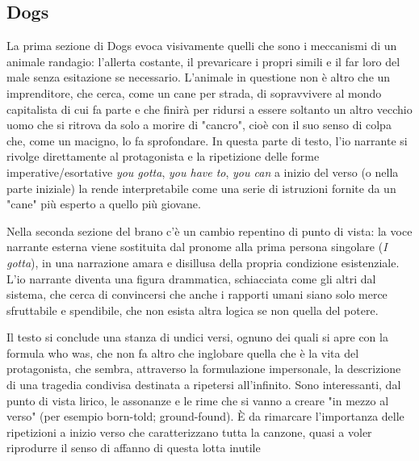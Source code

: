 \documentclass[class=book, crop=false, oneside, 12pt]{standalone}
\begin{document}
    \subsection{Dogs}
    La prima sezione di Dogs evoca visivamente quelli che sono i meccanismi di un animale randagio: l'allerta costante, il prevaricare i propri simili e il far loro del male senza esitazione se necessario. L'animale in questione non è altro che un imprenditore, che cerca, come un cane per strada, di sopravvivere al mondo capitalista di cui fa parte e che finirà per ridursi a essere soltanto un altro vecchio uomo che si ritrova da solo a morire di "cancro", cioè con il suo senso di colpa che, come un macigno, lo fa sprofondare. In questa parte di testo, l'io narrante si rivolge direttamente al protagonista e la ripetizione delle forme  imperative/esortative \emph{you gotta}, \emph{you have to}, \emph{you can} a inizio del verso (o nella parte iniziale) la rende interpretabile come una serie di istruzioni fornite da un "cane" più esperto a quello più giovane.

    Nella seconda sezione del brano c'è un cambio repentino di punto di vista: la voce narrante esterna viene sostituita dal pronome alla prima persona singolare (\emph{I gotta}), in una narrazione amara e disillusa della propria condizione esistenziale. L'io narrante diventa una figura drammatica, schiacciata come gli altri dal sistema, che cerca di convincersi che anche i rapporti umani siano solo merce sfruttabile e spendibile, che non esista altra logica se non quella del potere.

    Il testo si conclude una stanza di undici versi, ognuno dei quali si apre con la formula who was, che non fa altro che inglobare quella che è la vita del protagonista, che sembra, attraverso la formulazione impersonale, la descrizione di una tragedia condivisa destinata a ripetersi all'infinito. Sono interessanti, dal punto di vista lirico, le assonanze e le rime che si vanno a creare "in mezzo al verso" (per esempio born-told; ground-found). È da rimarcare l'importanza delle ripetizioni a inizio verso che caratterizzano tutta la canzone, quasi a voler riprodurre il senso di affanno di questa lotta inutile
\end{document}
